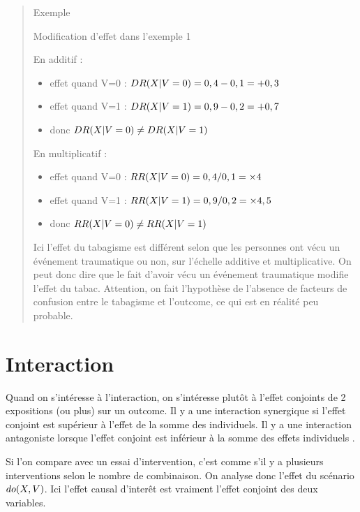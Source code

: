 \documentclass[
]{book}
\providecommand{\tightlist}{%
  \setlength{\itemsep}{0pt}\setlength{\parskip}{0pt}}
\begin{document}
\begin{quote}
Exemple

Modification d'effet dans l'exemple 1

En additif :

\begin{itemize}
\tightlist
\item
  effet quand V=0 : \(\small DR (X | V=0) = 0,4 - 0,1 = +0,3\)
\item
  effet quand V=1 : \(\small DR (X | V=1) = 0,9 - 0,2 = +0,7\)
\item
  donc \(\small DR (X | V=0) \neq DR (X | V=1)\)
\end{itemize}

En multiplicatif :

\begin{itemize}
\tightlist
\item
  effet quand V=0 : \(\small RR(X | V=0) = 0,4/0,1 = \times 4\)
\item
  effet quand V=1 : \(\small RR(X | V=1) = 0,9/0,2 = \times 4,5\)
\item
  donc \(\small RR(X | V=0) \neq RR(X | V=1)\)
\end{itemize}

Ici l'effet du tabagisme est différent selon que les personnes ont vécu un événement traumatique ou non, sur l'échelle additive et multiplicative. On peut donc dire que le fait d'avoir vécu un événement traumatique modifie l'effet du tabac. Attention, on fait l'hypothèse de l'absence de facteurs de confusion entre le tabagisme et l'outcome, ce qui est en réalité peu probable.
\end{quote}

\hypertarget{interaction}{%
\section{Interaction}\label{interaction}}

Quand on s'intéresse à l'interaction, on s'intéresse plutôt à l'effet conjoints de 2 expositions (ou plus) sur un outcome. Il y a une interaction synergique si l'effet conjoint est supérieur à l'effet de la somme des individuels. Il y a une interaction antagoniste lorsque l'effet conjoint est inférieur à la somme des effets individuels \citet{corraini_effect_2017}.

Si l'on compare avec un essai d'intervention, c'est comme s'il y a plusieurs interventions selon le nombre de combinaison. On analyse donc l'effet du scénario \(\small do(X, V)\). Ici l'effet causal d'interêt est vraiment l'effet conjoint des deux variables.
\end{document}
